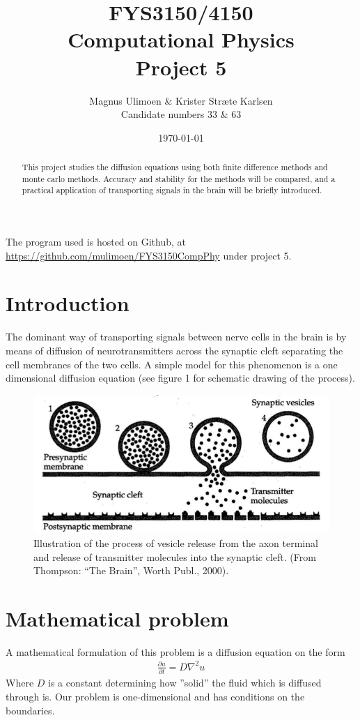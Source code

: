 \documentclass[11pt,a4paper,draft]{article}
\title{FYS3150/4150\\Computational Physics\\Project 5}
\author{Magnus Ulimoen \& Krister Stræte Karlsen\\
Candidate numbers 33 \& 63}
\date{\today}
\numberwithin{equation}{section}
\begin{document}
\maketitle

\begin{abstract}
This project studies the diffusion equations using both finite difference methods and monte carlo methods. Accuracy and stability for the methods will be compared, and a practical application of transporting signals in the brain will be briefly introduced. 
\end{abstract}

The program used is hosted on Github, at 
\url{https://github.com/mulimoen/FYS3150CompPhy} under project 5.

\section{Introduction}
The dominant way of transporting signals between nerve cells in the brain is by means of diffusion of neurotransmitters across the synaptic cleft separating the cell membranes of the two cells. A simple model for this phenomenon is a one dimensional diffusion equation (see figure 1 for schematic drawing of the process). 

\begin{figure}[H]
\centering
\includegraphics[scale=0.15]{fig1.png}
\caption{Illustration of the process of vesicle release from the axon terminal and release of transmitter molecules into the synaptic cleft. (From Thompson: “The Brain”, Worth Publ., 2000).}
\label{fig:spin_neighbours_full}
\end{figure}

\section{Mathematical problem}
A mathematical formulation of this problem is a diffusion equation on the form
\begin{gather}
\frac{\partial u}{\partial t} = D\nabla^2u
\end{gather}
Where $D$ is a constant determining how ''solid'' the fluid which is 
diffused through is. Our problem is one-dimensional and has conditions on 
the boundaries.
\end{document}
